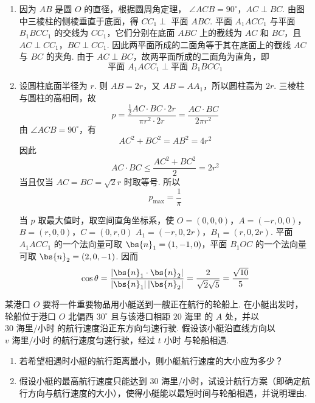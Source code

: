 \begin{solution}
\begin{enumerate}
\item 因为 \(AB\) 是圆 \(O\) 的直径，根据圆周角定理，
\(\angle ACB=90^{\circ}\)，\(AC\perp BC\).
由图中三棱柱的侧棱垂直于底面，得 \(CC_{1}\perp\) 平面 \(ABC\). 平面 \(A_{1}ACC_{1}\) 与平面 \(B_{1}BCC_{1}\) 的交线为 \(CC_{1}\)，它们分别在底面 \(ABC\) 上的截线为 \(AC\) 和 \(BC\)，且 \(AC\perp CC_{1}\)，\(BC\perp CC_{1}\). 因此两平面所成的二面角等于其在底面上的截线 \(AC\) 与 \(BC\) 的夹角. 由于 \(AC\perp BC\)，故两平面所成的二面角为直角，即
\[
\text{平面 }A_{1}ACC_{1}\perp\text{平面 }B_{1}BCC_{1}
\]

\item 设圆柱底面半径为 \(r\). 则 \(AB=2r\)，又 \(AB=AA_{1}\)，所以圆柱高为 \(2r\). 三棱柱与圆柱的高相同，故
\[
p=\frac{\frac12 AC\cdot BC\cdot2r}{\pi r^{2}\cdot2r}=\frac{AC\cdot BC}{2\pi r^{2}}
\]
由 \(\angle ACB=90^{\circ}\)，有
\[
AC^{2}+BC^{2}=AB^{2}=4r^{2}
\]
因此
\[
AC\cdot BC\leqslant\frac{AC^{2}+BC^{2}}{2}=2r^{2}
\]
当且仅当 \(AC=BC=\sqrt{2}r\) 时取等号. 所以
\[
p_{\max}=\frac1\pi
\]

当 \(p\) 取最大值时，取空间直角坐标系，使
\(O=(0,0,0)\)，\(A=(-r,0,0)\)，\(B=(r,0,0)\)，\(C=(0,r,0)\)
\(A_{1}=(-r,0,2r)\)，\(B_{1}=(r,0,2r)\).
平面 \(A_{1}ACC_{1}\) 的一个法向量可取 \(\bs{n}_{1}=(1,-1,0)\)，平面 \(B_{1}OC\) 的一个法向量可取 \(\bs{n}_{2}=(2,0,-1)\). 因而
\[
\cos\theta=\frac{|\bs{n}_{1}\cdot\bs{n}_{2}|}{|\bs{n}_{1}|\,|\bs{n}_{2}|}
=\frac{2}{\sqrt{2}\sqrt{5}}=\frac{\sqrt{10}}{5}
\]
\end{enumerate}
\end{solution}

\begin{problem}
某港口 \(O\) 要将一件重要物品用小艇送到一艘正在航行的轮船上. 在小艇出发时，轮船位于港口 \(O\) 北偏西 \(30^{\circ}\) 且与该港口相距 \(20\text{ 海里}\) 的 \(A\) 处，并以 \(30\text{ 海里/小时}\) 的航行速度沿正东方向匀速行驶. 假设该小艇沿直线方向以 \(v\text{ 海里/小时}\) 的航行速度匀速行驶，经过 \(t\text{ 小时}\) 与轮船相遇.
\begin{enumerate}
\item 若希望相遇时小艇的航行距离最小，则小艇航行速度的大小应为多少？
\item 假设小艇的最高航行速度只能达到 \(30\text{ 海里/小时}\)，试设计航行方案（即确定航行方向与航行速度的大小），使得小艇能以最短时间与轮船相遇，并说明理由.
\end{enumerate}
\end{problem}

